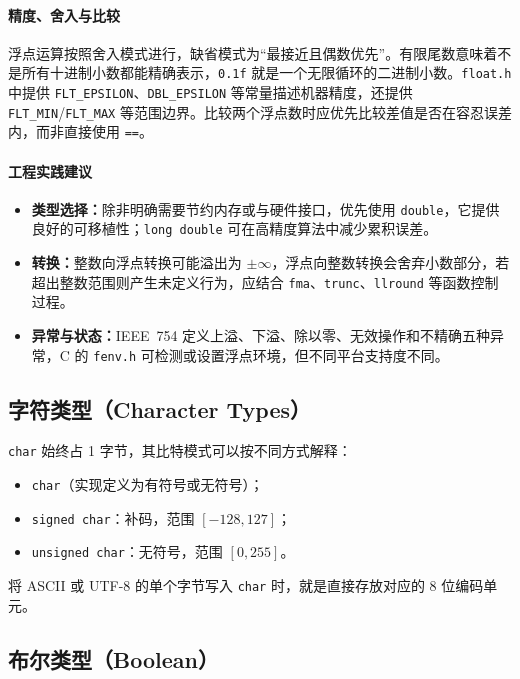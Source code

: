 \paragraph{精度、舍入与比较}
浮点运算按照舍入模式进行，缺省模式为“最接近且偶数优先”。有限尾数意味着不是所有十进制小数都能精确表示，\texttt{0.1f} 就是一个无限循环的二进制小数。\texttt{float.h} 中提供 \texttt{FLT\_EPSILON}、\texttt{DBL\_EPSILON} 等常量描述机器精度，还提供 \texttt{FLT\_MIN}/\texttt{FLT\_MAX} 等范围边界。比较两个浮点数时应优先比较差值是否在容忍误差内，而非直接使用 \texttt{==}。

\paragraph{工程实践建议}
\begin{itemize}
  \item \textbf{类型选择：}除非明确需要节约内存或与硬件接口，优先使用 \texttt{double}，它提供良好的可移植性；\texttt{long double} 可在高精度算法中减少累积误差。
  \item \textbf{转换：}整数向浮点转换可能溢出为 $\pm\infty$，浮点向整数转换会舍弃小数部分，若超出整数范围则产生未定义行为，应结合 \texttt{fma}、\texttt{trunc}、\texttt{llround} 等函数控制过程。
  \item \textbf{异常与状态：}IEEE~754 定义上溢、下溢、除以零、无效操作和不精确五种异常，C 的 \texttt{fenv.h} 可检测或设置浮点环境，但不同平台支持度不同。
\end{itemize}

\subsection{字符类型（Character Types）}

\texttt{char} 始终占 1 字节，其比特模式可以按不同方式解释：
\begin{itemize}
  \item \texttt{char}（实现定义为有符号或无符号）；
  \item \texttt{signed char}：补码，范围 $[-128,127]$；
  \item \texttt{unsigned char}：无符号，范围 $[0,255]$。
\end{itemize}
将 ASCII 或 UTF-8 的单个字节写入 \texttt{char} 时，就是直接存放对应的 8 位编码单元。

\subsection{布尔类型（Boolean）}

